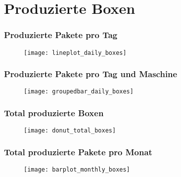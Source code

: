 \section{Produzierte Boxen}
\begin{frame}
    \frametitle{Produzierte Pakete pro Tag}
    \begin{figure}
        \centering
        \texttt{[image: lineplot\_daily\_boxes]}
    \end{figure}
\end{frame}

\begin{frame}
    \frametitle{Produzierte Pakete pro Tag und Maschine}

    \begin{figure}
        \centering
        \texttt{[image: groupedbar\_daily\_boxes]}
    \end{figure}

\end{frame}

\begin{frame}
    \frametitle{Total produzierte Boxen}

    \begin{figure}
        \centering
        \texttt{[image: donut\_total\_boxes]}
    \end{figure}

\end{frame}

\begin{frame}
    \frametitle{Total produzierte Pakete pro Monat}

    \begin{figure}
        \centering
        \texttt{[image: barplot\_monthly\_boxes]}
    \end{figure}

\end{frame}